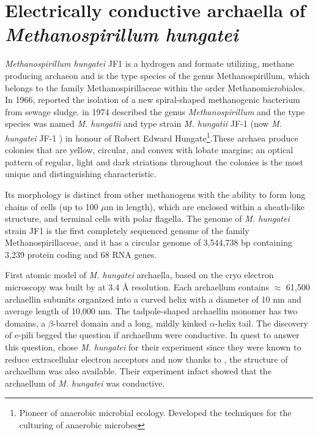 \documentclass[fontsize=12pt,headsepline=true, bibliography=totocnumbered, twoside]{scrbook} %
\begin{document}
\section[Electrically conductive archaella of \textit{M. hungatei}]{Electrically conductive archaella of \textit{Methanospirillum hungatei}}

\textit{Methanospirillum hungatei} JF1 is a hydrogen and formate utilizing, methane producing archaeon and is the type species of the genus Methanospirillum, which belongs to the family Methanospirillaceae within the order Methanomicrobiales\citep{gunsalus2016complete}. In 1966, \citet{smith1966microbial} reported the isolation
of a new spiral-shaped methanogenic bacterium
from sewage sludge. \citet{ferry1974methanospirillum} in 1974 described the genus \textit{Methanospirillum} and the type species was named \textit{M. hungatii} and type strain \textit{M. hungatii} JF-1 (now \textit{M. hungatei} JF-1 \citep{balch1979methanogens}) in honour of Robert Edward Hungate\footnote{Pioneer of anaerobic microbial ecology. Developed the techniques for the culturing of anaerobic microbes\citep{chung1997robert}}.These archaea produce colonies that are yellow, circular, and convex with lobate margins; an optical
pattern of regular, light and dark striations throughout the colonies is the most
unique and distinguishing characteristic\citep{ferry1974methanospirillum}.


Its morphology is distinct from other methanogens with the ability to form long chains of cells (up to 100 $\mu$m in length), which are enclosed within a sheath-like structure, and terminal cells with polar flagella. The genome of \textit{M. hungatei} strain JF1 is the first completely sequenced genome of the family Methanospirillaceae, and it has a circular genome of 3,544,738 bp containing 3,239 protein coding and 68 RNA genes\citep{gunsalus2016complete}.




First atomic model of \textit{M. hungatei} archaella, based on the cryo electron microscopy was built by \citet{poweleit2016cryoem} at 3.4 Å resolution. Each archaellum contains $\approx$ 61,500 archaellin subunits organized into a curved helix with a diameter of 10 nm and average length of 10,000 nm. The tadpole-shaped archaellin monomer has two domains, a $\beta$-barrel domain and a long, mildly kinked $\alpha$-helix tail\citep{poweleit2016cryoem}.
The discovery of \ac{e-pili} begged the question if archaellum were conductive. In quest to answer this question, \citet{walker2019archaellum} chose \textit{M. hungatei} for their experiment since they were known to reduce extracellular electron acceptors and now thanks to \citet{poweleit2016cryoem}, the structure of archaellum was also available. Their experiment infact showed that the archaellum of \textit{M. hungatei} was conductive.
\end{document}
